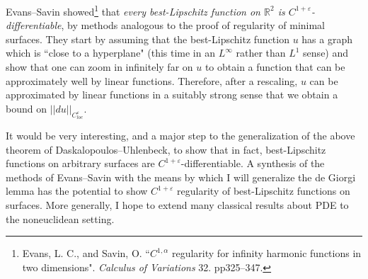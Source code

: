 \documentclass[12pt]{article}
\begin{document}
Evans--Savin showed\footnote{Evans, L. C., and Savin, O. ``$C^{1, \alpha}$ regularity for infinity harmonic functions in two dimensions". \emph{Calculus of Variations} 32. pp325--347.} that \emph{every best-Lipschitz function on $\mathbb R^2$ is $C^{1+\varepsilon}$-differentiable}, by methods analogous to the proof of regularity of minimal surfaces.
They start by assuming that the best-Lipschitz function $u$ has a graph which is ``close to a hyperplane" (this time in an $L^\infty$ rather than $L^1$ sense) and show that one can zoom in infinitely far on $u$ to obtain a function that can be approximately well by linear functions.
Therefore, after a rescaling, $u$ can be approximated by linear functions in a suitably strong sense that we obtain a bound on $||du||_{C^\varepsilon_{loc}}$.

It would be very interesting, and a major step to the generalization of the above theorem of Daskalopoulos--Uhlenbeck, to show that in fact, best-Lipschitz functions on arbitrary surfaces are $C^{1+\varepsilon}$-differentiable.
A synthesis of the methods of Evans--Savin with the means by which I will generalize the de Giorgi lemma has the potential to show $C^{1+\varepsilon}$ regularity of best-Lipschitz functions on surfaces.
More generally, I hope to extend many classical results about PDE to the noneuclidean setting.



\footnotesize
%
%
\printbibliography
\end{document}
